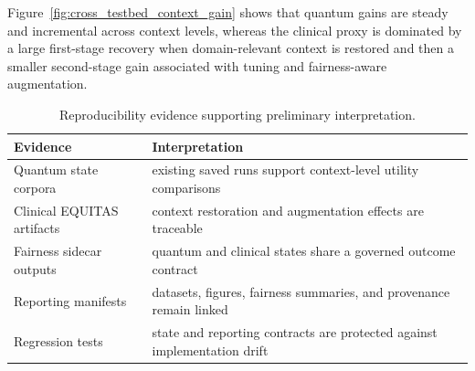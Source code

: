 \documentclass[conference]{IEEEtran}
\begin{document}
Figure~\ref{fig:cross_testbed_context_gain} shows that quantum gains are steady and incremental across context levels, whereas the clinical proxy is dominated by a large first-stage recovery when domain-relevant context is restored and then a smaller second-stage gain associated with tuning and fairness-aware augmentation.

\begin{table}[t]
\caption{Reproducibility evidence supporting preliminary interpretation.}
\label{tab:validation}
\centering
\small
\begin{tabular}{p{}p{}}
\toprule
\textbf{Evidence} & \textbf{Interpretation} \\
\midrule
Quantum state corpora & existing saved runs support context-level utility comparisons \\
Clinical EQUITAS artifacts & context restoration and augmentation effects are traceable \\
Fairness sidecar outputs & quantum and clinical states share a governed outcome contract \\
Reporting manifests & datasets, figures, fairness summaries, and provenance remain linked \\
Regression tests & state and reporting contracts are protected against implementation drift \\
\bottomrule
\end{tabular}
\end{table}
\end{document}
